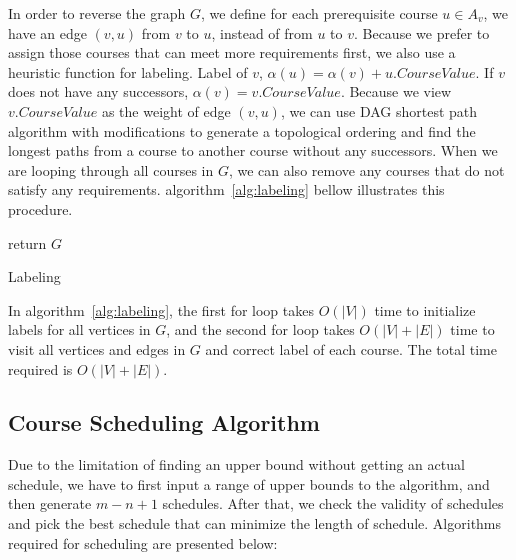 \documentclass[letterpaper,12pt]{article}
\theoremstyle{definition}
\begin{document}
In order to reverse the graph $G$, we define for each prerequisite course $u \in A_v$, we have an edge $(v,u)$ from $v$ to $u$, instead of from $u$ to $v$.
Because we prefer to assign those courses that can meet more requirements first, we also use a heuristic function for labeling. Label of $v$, $\alpha(u) = \alpha(v)+u.CourseValue$. If $v$ does not have any successors, $\alpha(v)=v.CourseValue$. Because we view $v.CourseValue$ as the weight of edge $(v,u)$, we can use DAG shortest path algorithm with modifications to generate a topological ordering and find the longest paths from a course to another course without any successors. When we are looping through all courses in $G$, we can also remove any courses that do not satisfy any requirements.
algorithm~\ref{alg:labeling} bellow illustrates this procedure. 

\begin{algorithm}[H]
return $G$

\caption{Labeling}\label{alg:labeling}

\end{algorithm}
\bigskip
In algorithm~\ref{alg:labeling}, the first for loop takes $O(|V|)$ time to initialize labels for all vertices in $G$, and the second for loop takes $O(|V|+|E|)$ time to visit all vertices and edges in $G$ and correct label of each course. The total time required is $O(|V|+|E|)$.

\subsection{Course Scheduling Algorithm}
Due to the limitation of finding an upper bound without getting an actual schedule, we have to first input a range of upper bounds to the algorithm, and then generate $m-n+1$ schedules. After that, we check the validity of schedules and pick the best schedule that can minimize the length of schedule. Algorithms required for scheduling are presented below: 
\end{document}

